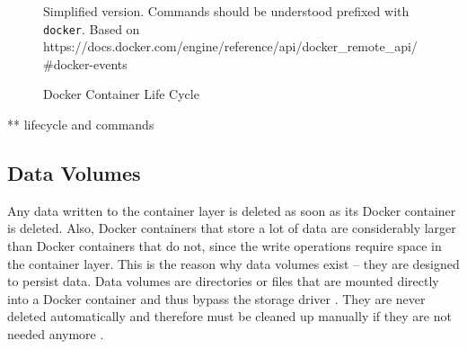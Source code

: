    \begin{figure}[htbp]
      \centering
      \caption*{Simplified version. Commands should be understood prefixed with \texttt{docker}. \newline \scriptsize Based on https://docs.docker.com/engine/reference/api/docker\_remote\_api/\#docker-events }
      \caption[Docker Container Life Cycle]{Docker Container Life Cycle \cite{Docker2016Docker}}
      \label{fig:docker_container_lifecycle}
    \end{figure}

    ** lifecycle and commands


  \subsection{Data Volumes} %
  \label{sub:data_volumes}
    Any data written to the container layer is deleted as soon as its Docker container is deleted.
    Also, Docker containers that store a lot of data are considerably larger than Docker containers that do not, since the write operations require space in the container layer. This is the reason why data volumes exist -- they are designed to persist data. Data volumes are directories or files that are mounted directly into a Docker container and thus bypass the storage driver \cite{Docker????Docker}. They are never deleted automatically and therefore must be cleaned up manually if they are not needed anymore \cite{Docker????Dockera}.

